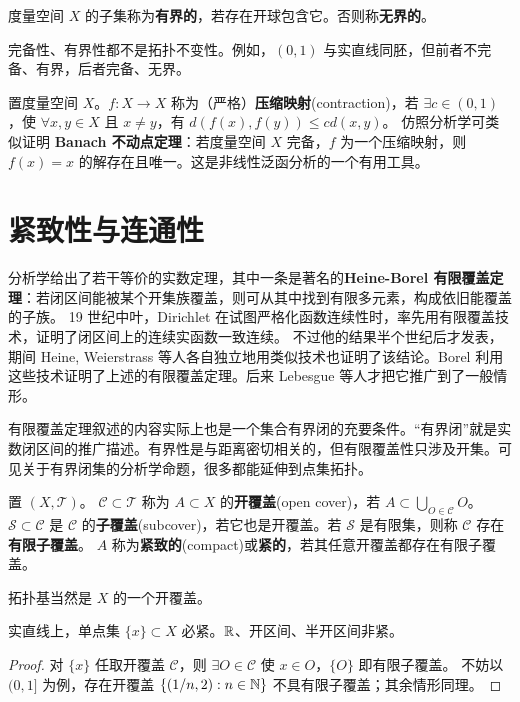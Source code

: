 \begin{definition}
    度量空间 $X$ 的子集称为\textbf{有界的}，若存在开球包含它。否则称\textbf{无界的}。
\end{definition}

\begin{remark}
    完备性、有界性都不是拓扑不变性。例如，$(0,1)$ 与实直线同胚，但前者不完备、有界，后者完备、无界。
\end{remark}

置度量空间 $X$。$f: X \to X$ 称为（严格）\textbf{压缩映射}(contraction)，若 $\exists c\in(0,1)$，使 $\forall x,y \in X$ 且 $x\ne y$，有 $d(f(x),f(y)) \leqslant c d(x,y)$。
仿照分析学可类似证明 \textbf{Banach 不动点定理}：若度量空间 $X$ 完备，$f$ 为一个压缩映射，则 $f(x)=x$ 的解存在且唯一。这是非线性泛函分析的一个有用工具。

\section{紧致性与连通性}

分析学给出了若干等价的实数定理，其中一条是著名的\textbf{Heine-Borel 有限覆盖定理}：若闭区间能被某个开集族覆盖，则可从其中找到有限多元素，构成依旧能覆盖的子族。
19 世纪中叶，Dirichlet 在试图严格化函数连续性时，率先用有限覆盖技术，证明了闭区间上的连续实函数一致连续。
不过他的结果半个世纪后才发表，期间 Heine, Weierstrass 等人各自独立地用类似技术也证明了该结论。Borel 利用这些技术证明了上述的有限覆盖定理。后来 Lebesgue 等人才把它推广到了一般情形。

有限覆盖定理叙述的内容实际上也是一个集合有界闭的充要条件。“有界闭”就是实数闭区间的推广描述。有界性是与距离密切相关的，但有限覆盖性只涉及开集。可见关于有界闭集的分析学命题，很多都能延伸到点集拓扑。

\begin{definition}
    置 $(X,\mathscr T)$。
    $\mathscr C\subset\mathscr T$ 称为 $A\subset X$ 的\textbf{开覆盖}(open cover)，若 $A\subset\bigcup_{O\in\mathscr C}O$。
    $\mathscr S\subset\mathscr C$ 是 $\mathscr C$ 的\textbf{子覆盖}(subcover)，若它也是开覆盖。若 $\mathscr S$ 是有限集，则称 $\mathscr C$ 存在\textbf{有限子覆盖}。
    $A$ 称为\textbf{紧致的}(compact)或\textbf{紧的}，若其任意开覆盖都存在有限子覆盖。
\end{definition}

\begin{eg}
    拓扑基当然是 $X$ 的一个开覆盖。
\end{eg}

\begin{eg}
    实直线上，单点集 $\{x\}\subset X$ 必紧。$\mathbb{R}$、开区间、半开区间非紧。
\end{eg}
\begin{proof}
    对 $\{x\}$ 任取开覆盖 $\mathscr C$，则 $\exists O\in\mathscr C$ 使 $x\in O$，$\{O\}$ 即有限子覆盖。
    不妨以 $(0,1]$ 为例，存在开覆盖 $\{(1/n,2):n\in\mathbb{N}\}$ 不具有限子覆盖；其余情形同理。
\end{proof}

